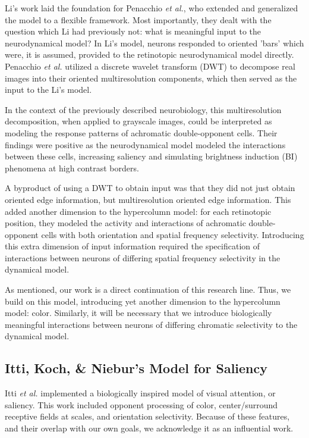 \documentclass[journal,onecolumn]{IEEEtran}
\begin{document}
Li's work laid the foundation for Penacchio \textit{et al.}, who extended and generalized the model to a flexible framework. Most importantly, they dealt with the question which Li had previously not: what is meaningful input to the neurodynamical model? In Li's model, neurons responded to oriented 'bars' which were, it is assumed, provided to the retinotopic neurodynamical model directly. Penacchio \textit{et al.} utilized a discrete wavelet transform (DWT) to decompose real images into their oriented multiresolution components, which then served as the input to the Li's model.

In the context of the previously described neurobiology, this multiresolution decomposition, when applied to grayscale images, could be interpreted as modeling the response patterns of achromatic double-opponent cells. Their findings were positive as the neurodynamical model modeled the interactions between these cells, increasing saliency and simulating brightness induction (BI) phenomena at high contrast borders.

A byproduct of using a DWT to obtain input was that they did not just obtain oriented edge information, but multiresolution oriented edge information. This added another dimension to the hypercolumn model: for each retinotopic position, they modeled the activity and interactions of achromatic double-opponent cells with both orientation and spatial frequency selectivity. Introducing this extra dimension of input information required the specification of interactions between neurons of differing spatial frequency selectivity in the dynamical model.

As mentioned, our work is a direct continuation of this research line. Thus, we build on this model, introducing yet another dimension to the hypercolumn model: color. Similarly, it will be necessary that we introduce biologically meaningful interactions between neurons of differing chromatic selectivity to the dynamical model.


\subsection*{Itti, Koch, \& Niebur's Model for Saliency \cite{itti:1998}}

Itti \textit{et al.} implemented a biologically inspired model of visual attention, or saliency. This work included opponent processing of color, center/surround receptive fields at scales, and orientation selectivity. Because of these features, and their overlap with our own goals, we acknowledge it as an influential work.
\end{document}
